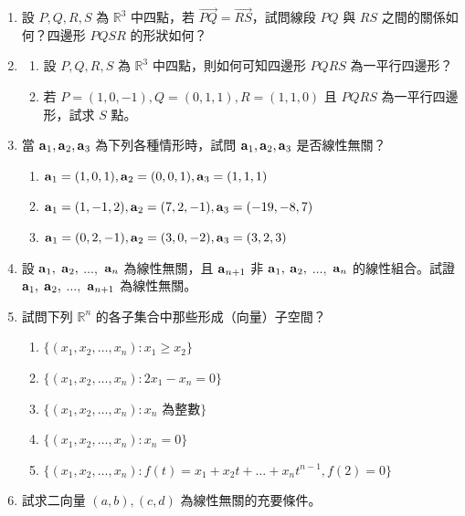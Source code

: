 \begin{enumerate}[label=\arabic*., leftmargin=2em]
  \item 設 $P, Q, R, S$ 為 $\mathbb{R}^3$ 中四點，若 $\vec{PQ} = \vec{RS}$，試問線段 $PQ$ 與 $RS$ 之間的關係如何？四邊形 $PQSR$ 的形狀如何？

  \item
  \begin{enumerate}[label=(\alph*)]
    \item 設 $P, Q, R, S$ 為 $\mathbb{R}^3$ 中四點，則如何可知四邊形 $PQRS$ 為一平行四邊形？
    \item 若 $P=(1, 0, -1), Q=(0, 1, 1), R=(1, 1, 0)$ 且 $PQRS$ 為一平行四邊形，試求 $S$ 點。
  \end{enumerate}

  \item 當 $\boldsymbol{\mathbf{a}}_1, \boldsymbol{\mathbf{a}}_2, \boldsymbol{\mathbf{a}}_3$ 為下列各種情形時，試問 $\boldsymbol{\mathbf{a}}_1, \boldsymbol{\mathbf{a}}_2, \boldsymbol{\mathbf{a}}_3$ 是否線性無關？
  \begin{enumerate}[label=(\alph*)]
    \item $\boldsymbol{\mathbf{a}}_1=(1, 0, 1), \boldsymbol{\mathbf{a}}_2=(0, 0, 1), \boldsymbol{\mathbf{a}}_3=(1, 1, 1)$
    \item $\boldsymbol{\mathbf{a}}_1=(1, -1, 2), \boldsymbol{\mathbf{a}}_2=(7, 2, -1), \boldsymbol{\mathbf{a}}_3=(-19, -8, 7)$
    \item $\boldsymbol{\mathbf{a}}_1=(0, 2, -1), \boldsymbol{\mathbf{a}}_2=(3, 0, -2), \boldsymbol{\mathbf{a}}_3=(3, 2, 3)$
  \end{enumerate}

  \item[\textbf{*16.}] 設 $\boldsymbol{\mathbf{a}}_1,$ $\boldsymbol{\mathbf{a}}_2,$ $\dots,$ $\boldsymbol{\mathbf{a}}_n$ 為線性無關，且 $\boldsymbol{\mathbf{a}}_{n+1}$ 非 $\boldsymbol{\mathbf{a}}_1,$ $\boldsymbol{\mathbf{a}}_2,$ $\dots,$ $\boldsymbol{\mathbf{a}}_n$ 的線性組合。試證 $\boldsymbol{\mathbf{a}}_1,$ $\boldsymbol{\mathbf{a}}_2,$ $\dots,$ $\boldsymbol{\mathbf{a}}_{n+1}$ 為線性無關。

  \item[\textbf{**17.}] 試問下列 $\mathbb{R}^n$ 的各子集合中那些形成（向量）子空間？
  \begin{enumerate}[label=(\alph*)]
    \item $\{ (x_1, x_2, \dots, x_n) : x_1 \ge x_2 \}$
    \item $\{ (x_1, x_2, \dots, x_n) : 2x_1 - x_n = 0 \}$
    \item $\{ (x_1, x_2, \dots, x_n) : x_n \text{ 為整數} \}$
    \item $\{ (x_1, x_2, \dots, x_n) : x_n = 0 \}$
    \item $\{ (x_1, x_2, \dots, x_n) : f(t) = x_1 + x_2 t + \dots + x_n t^{n-1}, f(2) = 0 \}$
  \end{enumerate}

  \item 試求二向量 $(a, b), (c, d)$ 為線性無關的充要條件。


\end{enumerate}
